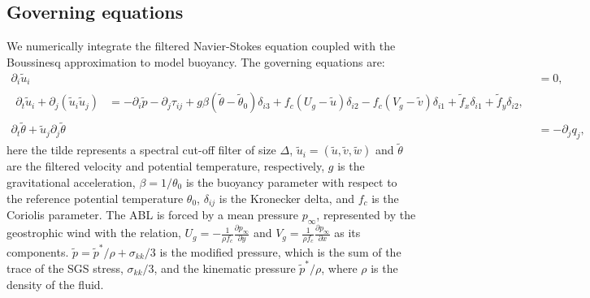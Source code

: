 \documentclass[%
 aip,
 amsmath,amssymb,
preprint,%
author-numerical,%
]{revtex4-1}
\begin{document}
\subsection{Governing equations}\label{sec2.1}
We numerically integrate the filtered Navier-Stokes equation coupled with the Boussinesq approximation to model buoyancy. The governing equations are: 
%
\begin{align}
 \partial_{\mathit{i}} \widetilde{u}_\mathit{i}&=0,\label{eqn1}\\
 \begin{split}
 \partial_{\mathit{t}}\widetilde{u}_\mathit{i} + \partial_\mathit{j}\left(\widetilde{u}_\mathit{i}\widetilde{u}_\mathit{j}\right)&=-\partial_{\mathit{i}}\widetilde{p}-\partial_\mathit{j}\tau_{\mathit{ij}} + g\beta(\widetilde{\theta}-\widetilde{\theta}_\mathit{0})\delta_{\mathit{i3}}+f_c(U_g-\widetilde{u})\delta_{i2}-f_c(V_g-\widetilde{v})\delta_{i1}+ \widetilde{f}_x\delta_{i1}+ \widetilde{f}_y\delta_{i2},
 \end{split}\label{eqn2}\\
 \partial_{\mathit{t}}\widetilde{\theta} + \widetilde{u}_\mathit{j}\partial_{\mathit{j}}\widetilde{\theta}&=-\partial_{\mathit{j}}q_\mathit{j},\label{eqn3}
\end{align}
%
here the tilde represents a spectral cut-off filter of size $\Delta$, $\widetilde{u}_\mathit{i}=\left(\widetilde{u},\widetilde{v},\widetilde{w}\right)$ and $\widetilde{\theta}$ are the filtered velocity and potential temperature, respectively, $g$ is the gravitational acceleration, $\beta=1/\theta_\mathit{0}$ is the buoyancy parameter with respect to the reference potential temperature $\theta_\mathit{0}$, $\delta_{\mathit{ij}}$ is the Kronecker delta, and $f_c$ is the Coriolis parameter. The ABL is forced by a mean pressure $p_\infty$, represented by the geostrophic wind with the relation, $U_g=-\frac{1}{{\rho}f_c}\frac{\partial{p_{\infty}}}{\partial{y}}$ and $V_g=\frac{1}{{\rho}f_c}\frac{\partial{p_{\infty}}}{\partial{x}}$ as its components. $\widetilde{p}=\widetilde{p}^{*}/\rho+\sigma_{kk}/3$ is the modified pressure, which is the sum of the trace of the SGS stress, $\sigma_{kk}/3$, and the kinematic pressure $\widetilde{p}^{*}/\rho$, where $\rho$ is the density of the fluid. 
\end{document}

